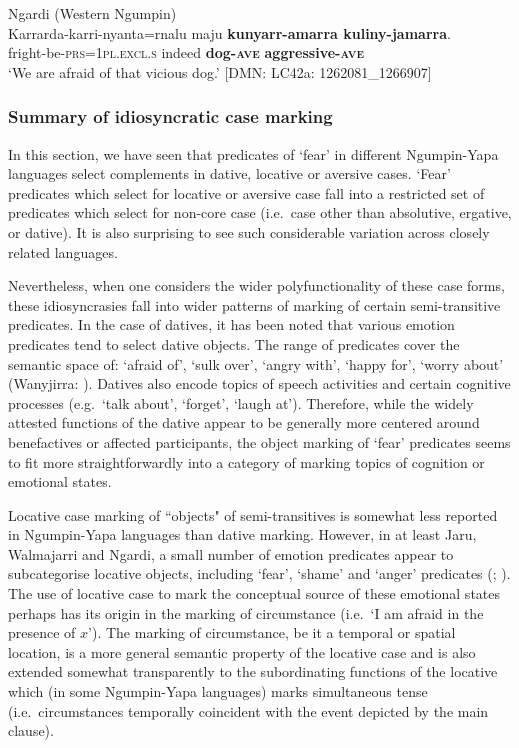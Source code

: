 \documentclass[output=paper,colorlinks,citecolor=brown]{langscibook}
\begin{document}
\ea 
\textnormal{Ngardi (Western Ngumpin)} \\
\gll Karrarda-karri-nyanta=rnalu maju \textbf{kunyarr-amarra kuliny-jamarra}. \\
fright-be-\textsc{prs=1pl.excl.s} indeed \textbf{dog-\textsc{ave}} \textbf{aggressive-\textsc{ave}} \\
\glt `We are afraid of that vicious dog.' $[$DMN: LC42a: 1262081\_1266907$]$
\label{ex:bro42}
\z



\subsubsection{Summary of idiosyncratic case marking}
\label{subsubsec:summaryidiosyncratic}

In this section, we have seen that predicates of `fear' in different Ngumpin-Yapa languages select complements in dative, locative or aversive cases. `Fear' predicates which select for locative or aversive case fall into a restricted set of predicates which select for non-core case (i.e.\  case other than absolutive, ergative, or dative). It is also surprising to see such considerable variation across closely related languages.

Nevertheless, when one considers the wider polyfunctionality of these case forms, these idiosyncrasies fall into wider patterns of marking of certain semi-transitive predicates. In the case of datives, it has been noted that various emotion predicates tend to select dative objects. The range of predicates cover the semantic space of: `afraid of', `sulk over', `angry with', `happy for', `worry about' (Wanyjirra: \cite[571]{senge_grammar_2015}). Datives also encode topics of speech activities and certain cognitive processes (e.g.\  `talk about', `forget', `laugh at'). Therefore, while the widely attested functions of the dative appear to be generally more centered around benefactives or affected participants, the object marking of `fear' predicates seems to fit more straightforwardly into a category of marking topics of cognition or emotional states.

Locative case marking of ``objects" of semi-transitives is somewhat less reported in Ngumpin-Yapa languages than dative marking. However, in at least Jaru, Walmajarri and Ngardi, a small number of emotion predicates appear to subcategorise locative objects, including `fear', `shame' and `anger' predicates (\cite[58]{tsunoda_djaru_1981}; \cite[529]{ennever_grammar_2021}). The use of locative case to mark the conceptual source of these emotional states perhaps has its origin in the marking of circumstance (i.e.\  `I am afraid in the presence of $x$'). The marking of circumstance, be it a temporal or spatial location, is a more general semantic property of the locative case and is also extended somewhat transparently to the subordinating functions of the locative which (in some Ngumpin-Yapa languages) marks simultaneous tense (i.e.\  circumstances temporally coincident with the event depicted by the main clause).
\end{document}
